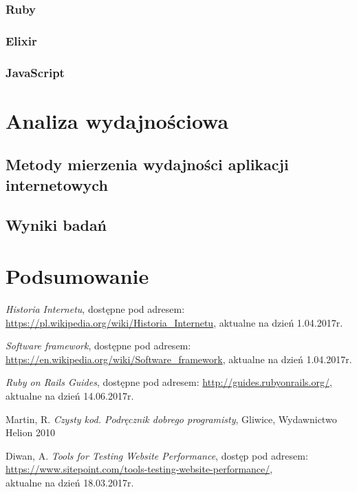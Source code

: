 \documentclass[mgr,oneside]{mgr}
\begin{document}
\subsection{Ruby}
\subsection{Elixir}
\subsection{JavaScript}

\chapter{Analiza wydajnościowa}
\label{cha:analiza_wydajnosciowa}
\section{Metody mierzenia wydajności aplikacji internetowych}
\section{Wyniki badań}

\chapter{Podsumowanie}

\renewcommand\bibname{Literatura}
\begin{thebibliography}{inteligencja}

  \emph{Historia Internetu}, dostępne pod adresem: \url{https://pl.wikipedia.org/wiki/Historia_Internetu}, aktualne na dzień 1.04.2017r.

  \emph{Software framework}, dostępne pod adresem: \url{https://en.wikipedia.org/wiki/Software_framework}, aktualne na dzień 1.04.2017r.

	\emph{Ruby on Rails Guides}, dostępne pod adresem: \url{http://guides.rubyonrails.org/},\\ aktualne na dzień 14.06.2017r.

	Martin, R. \emph{Czysty kod. Podręcznik dobrego programisty}, Gliwice, Wydawnictwo Helion 2010

  Diwan, A. \emph{Tools for Testing Website Performance}, dostęp pod adresem: \url{https://www.sitepoint.com/tools-testing-website-performance/}, \\ aktualne na dzień 18.03.2017r.

\end{thebibliography}
\end{document}
